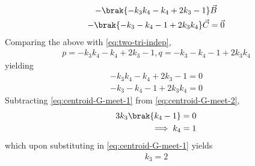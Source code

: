 \begin{enumerate}[label=\thesection.\arabic*.,ref=\thesection.\theenumi]
\begin{multline}
	  \\
	-  \brak{-k_3k_4-k_4+2k_3-1}\vec{B}
	  \\
	  - \brak{-k_3-k_4 - 1 
+2k_3k_4} \vec{C} = \vec{0}
  \end{multline}
  Comparing the above with 
	  \eqref{eq:two-tri-indep},
  \begin{align}
	  p = {-k_3k_4-k_4+2k_3-1}, q = {-k_3-k_4 - 1 
+2k_3k_4}
  \end{align}
  yielding 
  \begin{align}
	  \label{eq:centroid-G-meet-1}
	   {-k_3k_4-k_4+2k_3-1} = 0
	   \\ {-k_3-k_4 - 1 
+2k_3k_4} = 0
	  \label{eq:centroid-G-meet-2}
  \end{align}
  Subtracting 
	  \eqref{eq:centroid-G-meet-1}
	  from
	  \eqref{eq:centroid-G-meet-2},
  \begin{align}
	  3k_3\brak{k_4-1} &= 0
	  \\
	  \implies k_4&=1
  \end{align}
  which upon substituting in 
	  \eqref{eq:centroid-G-meet-1}
	  yields
  \begin{align}
	  k_3 = 2
  \end{align}
\end{enumerate}
